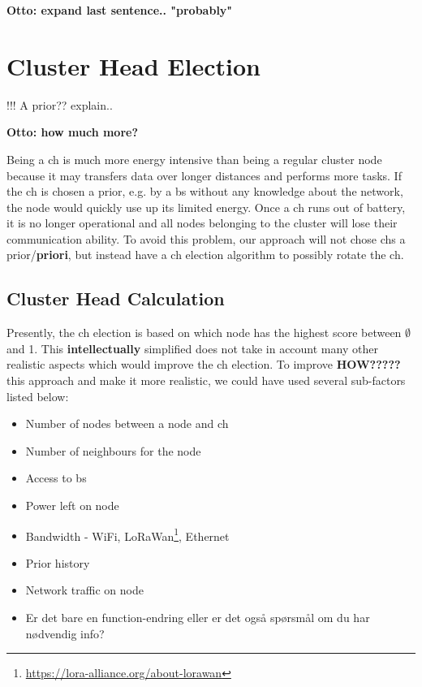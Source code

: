 \documentclass[USenglish]{uit-thesis}
\begin{document}
\textbf{Otto: expand last sentence.. "probably"}


\section{Cluster Head Election}
!!! A prior?? explain..

\textbf{Otto: how much more?}

Being a \gls{ch} is much more energy intensive than being a regular cluster node because it may transfers data over longer distances and performs more tasks. If the \gls{ch} is chosen a prior, e.g. by a \gls{bs} without any knowledge about the network, the node would quickly use up its limited energy. Once a \gls{ch} runs out of battery, it is no longer operational and all nodes belonging to the cluster will lose their communication ability. To avoid this problem, our approach will not chose \gls{ch}s a prior/\textbf{priori}, but instead have a \gls{ch} election algorithm to possibly rotate the \gls{ch}.


\subsection{Cluster Head Calculation} \label{ssec:ch_election}
Presently, the \gls{ch} election is based on which node has the highest score between $\emptyset$ and 1. This \textbf{intellectually} simplified does not take in account many other realistic aspects which would improve the \gls{ch} election. To improve \textbf{HOW?????} this approach and make it more realistic, we could have used several sub-factors listed below:


\begin{itemize}
\item Number of nodes between a node and \gls{ch}
\item Number of neighbours for the node
\item Access to \gls{bs}
\item Power left on node
\item Bandwidth - WiFi, LoRaWan\footnote{\url{https://lora-alliance.org/about-lorawan}}, Ethernet
\item Prior history
\item Network traffic on node
\item Er det bare en function-endring eller er det også spørsmål om du har nødvendig info?
\end{itemize}
\end{document}
